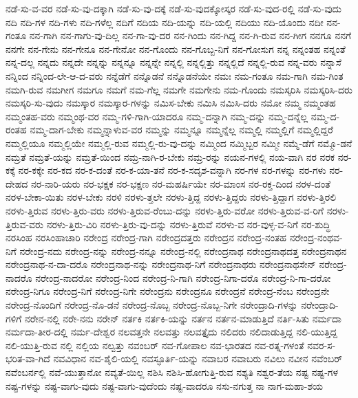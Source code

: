 {ನಡೆ-ಸು-ವ-ವರ
ನಡೆ-ಸು-ವು-ದಕ್ಕಾಗಿ
ನಡೆ-ಸು-ವು-ದಕ್ಕೆ
ನಡೆ-ಸು-ವುದಕ್ಕೋಸ್ಕರ
ನಡೆ-ಸು-ವುದ-ರಲ್ಲಿ
ನಡೆ-ಸು-ವುದು
ನದಿ
ನದಿ-ಗಳ
ನದಿ-ಗಳು
ನದಿ-ಗಳೆಲ್ಲ
ನದಿಗೆ
ನದಿಯ
ನದಿ-ಯನ್ನು
ನದಿ-ಯಲ್ಲಿ
ನದಿಯು
ನದಿ-ಯೊಂದು
ನದೀ
ನನ-ಗಂತೂ
ನನ-ಗಾಗಿ
ನನ-ಗಾಗು-ವು-ದಿಲ್ಲ
ನನ-ಗಾ-ವು-ದರ
ನನ-ಗಿಂದು
ನನ-ಗಿದ್ದ
ನನ-ಗಿ-ರುವ
ನನ-ಗೀಗ
ನನಗೂ
ನನಗೆ
ನನಗೇ
ನನ-ಗೇನು
ನನ-ಗೇನೂ
ನನ-ಗೇನೋ
ನನ-ಗೊಂದು
ನನ-ಗೊಬ್ಬ-ನಿಗೆ
ನನ-ಗೋಸುಗ
ನನ್ನ
ನನ್ನಂತಹ
ನನ್ನಂತೆ
ನನ್ನ-ದಲ್ಲ
ನನ್ನದು
ನನ್ನದೇ
ನನ್ನನ್ನು
ನನ್ನನ್ನೂ
ನನ್ನನ್ನೇ
ನನ್ನಲ್ಲಿ
ನನ್ನಲ್ಲಿತ್ತು
ನನ್ನಲ್ಲಿದೆ
ನನ್ನಲ್ಲಿ-ರುವ
ನನ್ನ-ವರು
ನನ್ನಾಸೆ
ನನ್ನಿಂದ
ನನ್ನಿಂದ-ಲೇ-ಆ-ದ-ವರು
ನನ್ನೆಡೆಗೆ
ನನ್ನೊಡನೆ
ನನ್ನೊಡನೆಯೇ
ನಮಃ
ನಮ-ಗಂತೂ
ನಮ-ಗಾಗಿ
ನಮ-ಗಿಂತ
ನಮಗಿ-ರುವ
ನಮಗೀಗ
ನಮಗೂ
ನಮಗೆ
ನಮ-ಗೆಲ್ಲ
ನಮಗೇ
ನಮಗೇನು
ನಮ-ಗೊಂದು
ನಮಸ್ಕರಿಸಿ
ನಮಸ್ಕರಿಸಿ-ದರು
ನಮಸ್ಕರಿ-ಸು-ವುದು
ನಮಸ್ಕಾರ
ನಮಸ್ಕಾರ-ಗಳನ್ನು
ನಮಿಸ-ಬೇಕು
ನಮಿಸಿ
ನಮಿಸಿ-ದರು
ನಮೋ
ನಮ್ಮ
ನಮ್ಮಂತಹ
ನಮ್ಮಂತಹ-ವರು
ನಮ್ಮಂಥ-ವರ
ನಮ್ಮ-ಗಳಿ-ಗಾಗಿ-ಯಾದರೂ
ನಮ್ಮ-ದನ್ನಾಗಿ
ನಮ್ಮ-ದನ್ನು
ನಮ್ಮ-ದನ್ನೆಲ್ಲ
ನಮ್ಮ-ದ-ರಂತಹ
ನಮ್ಮ-ದಾಗ-ಬೇಕು
ನಮ್ಮನ್ನಾಳುವ-ವರ
ನಮ್ಮನ್ನು
ನಮ್ಮನ್ನೂ
ನಮ್ಮನ್ನೆಲ್ಲ
ನಮ್ಮಲ್ಲಿ
ನಮ್ಮಲ್ಲಿಗೆ
ನಮ್ಮಲ್ಲಿದ್ದರೆ
ನಮ್ಮಲ್ಲಿಯೂ
ನಮ್ಮಲ್ಲಿಯೇ
ನಮ್ಮಲ್ಲಿ-ರುವ
ನಮ್ಮಲ್ಲಿ-ರು-ವು-ದನ್ನು
ನಮ್ಮಿಂದ
ನಮ್ಮಿಬ್ಬರ
ನಮ್ಮೀ
ನಮ್ಮೆ-ಡೆಗೆ
ನಮ್ಮೊ-ಡನೆ
ನಮ್ರತೆ
ನಮ್ರತೆ-ಯನ್ನು
ನಮ್ರತೆ-ಯಿಂದ
ನಮ್ರ-ನಾಗಿ-ರ-ಬೇಕು
ನಮ್ರ-ರನ್ನು
ನಯನ-ಗಳಲ್ಲಿ
ನಯ-ವಾಗಿ
ನರ
ನರಕ
ನರ-ಕಕ್ಕೆ
ನರ-ಕಕ್ಕೇ
ನರ-ಕದ
ನರ-ಕ-ದಂತೆ
ನರ-ಕ-ಯಾ-ತನೆ
ನರ-ಕ-ಸದೃಶ-ವನ್ನಾಗಿ
ನರ-ಗಳ
ನರ-ಗಳನ್ನು
ನರ-ಗಳು
ನರ-ದೇಹದ
ನರ-ನಾರಿ-ಯರು
ನರ-ಭಕ್ಷಕ
ನರ-ಭಕ್ಷಣ
ನರ-ಮಹರ್ಷಿಯೇ
ನರ-ಮಾಂಸ
ನರ-ರಕ್ತ-ದಿಂದ
ನರಳ-ದಂತೆ
ನರಳ-ಬೇಕಾ-ಯಿತು
ನರಳ-ಬೇಕು
ನರಳಿ
ನರಳು-ತ್ತಲೇ
ನರಳು-ತ್ತಿದ್ದ
ನರಳು-ತ್ತಿದ್ದರು
ನರಳು-ತ್ತಿದ್ದಾಗ
ನರಳು-ತ್ತಿರಲಿ
ನರಳು-ತ್ತಿರುವ
ನರಳು-ತ್ತಿರು-ವರು
ನರಳು-ತ್ತಿರುವ-ರೆಂಬು-ದನ್ನು
ನರಳು-ತ್ತಿರು-ವರೋ
ನರಳು-ತ್ತಿರುವ-ವ-ರಿಗೆ
ನರಳು-ತ್ತಿರುವ-ವರು
ನರಳು-ತ್ತಿರು-ವಿರಿ
ನರಳು-ತ್ತಿರು-ವು-ದನ್ನು
ನರಳು-ತ್ತಿರುವೆ
ನರಳು-ವ
ನರ-ವುಳ್ಳ-ವ-ನಿಗೆ
ನರ-ಶುದ್ಧಿ
ನರಸಿಂಹ
ನರಸಿಂಹಾಚಾರಿ
ನರೇಂದ್ರ
ನರೇಂದ್ರ-ಗಾಗಿ
ನರೇಂದ್ರದತ್ತರು
ನರೇಂದ್ರನ
ನರೇಂದ್ರ-ನಂತಹ
ನರೇಂದ್ರ-ನಂಥವ-ನಿಗೆ
ನರೇಂದ್ರ-ನದು
ನರೇಂದ್ರ-ನನ್ನು
ನರೇಂದ್ರ-ನನ್ನೂ
ನರೇಂದ್ರ-ನಲ್ಲಿ
ನರೇಂದ್ರನಾಥ
ನರೇಂದ್ರನಾಥದತ್ತ
ನರೇಂದ್ರನಾಥನ
ನರೇಂದ್ರನಾಥ-ನ-ದಾ-ದರೊ
ನರೇಂದ್ರನಾಥ-ನನ್ನು
ನರೇಂದ್ರನಾಥ-ನಿಗೆ
ನರೇಂದ್ರನಾಥರು
ನರೇಂದ್ರನಾಥಸೇನ್
ನರೇಂದ್ರ-ನಾದರೊ
ನರೇಂದ್ರ-ನಾದರೋ
ನರೇಂದ್ರ-ನಿಂದ
ನರೇಂದ್ರ-ನಿ-ಗಾಗಿ
ನರೇಂದ್ರ-ನಿಗಾ-ದರೊ
ನರೇಂದ್ರ-ನಿ-ಗಾ-ದರೋ
ನರೇಂದ್ರ-ನಿಗೂ
ನರೇಂದ್ರ-ನಿಗೆ
ನರೇಂದ್ರ-ನಿಗೇ
ನರೇಂದ್ರನು
ನರೇಂದ್ರನೂ
ನರೇಂದ್ರನೆ
ನರೇಂದ್ರ-ನೆಂಬ
ನರೇಂದ್ರನೇ
ನರೇಂದ್ರ-ನೊಂದಿಗೆ
ನರೇಂದ್ರ-ನೊ-ಡನೆ
ನರೇಂದ್ರ-ನೊಬ್ಬ
ನರೇಂದ್ರ-ನೊಬ್ಬ-ನಿಗೇ
ನರೇಂದ್ರಾದಿ-ಗಳನ್ನು
ನರೇಂದ್ರಾದಿ-ಗಳಿಗೆ
ನರೇನ-ನಲ್ಲಿ
ನರೇ-ನನು
ನರೇನ್
ನರ್ತಕಿ
ನರ್ತಕಿ-ಯನ್ನು
ನರ್ತನ
ನರ್ತನ-ಮಾಡುತ್ತಿದೆ
ನರ್ತಿ-ಸಿತು
ನರ್ಮದಾ
ನರ್ಮದಾ-ತೀರ-ದಲ್ಲಿ
ನರ್ಮ-ದೇಶ್ವರ
ನಲವತ್ತನೇ
ನಲವತ್ತು
ನಲವತ್ತೈದು
ನಲಿದರು
ನಲಿದಾಡುತ್ತಿದ್ದ
ನಲಿ-ಯುತ್ತಿದ್ದ
ನಲಿ-ಯುತ್ತಿ-ರುವ
ನಲ್ಲಿ
ನಲ್ಲಿಯ
ನಲ್ವತ್ತು
ನವಂಬರ್
ನವ-ಗೋಪಾಲ
ನವ-ಭಾರತದ
ನವ-ರತ್ನ-ಗಳಂತೆ
ನವರ-ಸ-ಭರಿತ-ವಾ-ಗಿದೆ
ನವವಿಧಾನ
ನವ-ಶೈಲಿ-ಯಲ್ಲಿ
ನವಸ್ಫೂರ್ತಿ-ಯನ್ನು
ನವಾಬರ
ನವಾಬರು
ನವಿಲು
ನವೀನ
ನವೆಂಬರ್
ನವೆಂಬರ್ನಲ್ಲಿ
ನವೆ-ಯುತ್ತಾನೋ
ನವ್ಯತೆ-ಯಿಲ್ಲ
ನಶಿಸಿ
ನಶಿಸಿ-ಹೋಗುತ್ತಿ-ರುವ
ನಶ್ಯತಿ
ನಶ್ವರ-ತೆಯ
ನಷ್ಟ
ನಷ್ಟ-ಗಳ
ನಷ್ಟ-ಗಳನ್ನು
ನಷ್ಟ-ವಾಗು-ವುದು
ನಷ್ಟ-ವಾಗು-ವುದೆಂದು
ನಷ್ಟ-ವಾದರೂ
ನಸು-ನಗುತ್ತ
ನಾ
ನಾಗ-ಮಹಾ-ಶಯ
}

